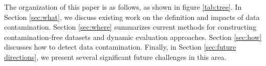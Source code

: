 The organization of this paper is as follows, as shown in figure \ref{tab:tree}. In Section \ref{sec:what}, we discuss existing work on the definition and impacts of data contamination. Section \ref{sec:where}  summarizes current methods for constructing contamination-free datasets and dynamic evaluation approaches. Section \ref{sec:how} discusses how to detect data contamination. Finally, in Section \ref{sec:future directions}, we present several significant future challenges in this area.

